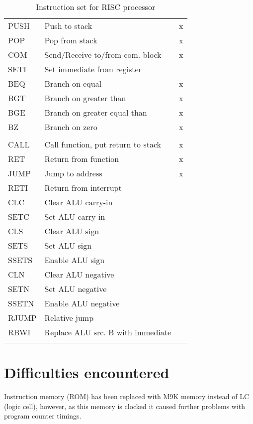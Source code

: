 \documentclass[a4paper,11pt]{article}
\begin{document}
\begin{table}[h!]
\begin{tabular}{| l | p{13cm} | c |}
		PUSH 
& Push to stack & x \\
		POP  
& Pop from stack & x \\
		COM  
& Send/Receive to/from com. block & x \\
		SETI 
& Set immediate from register & \\\hline
		
		BEQ  
& Branch on equal & x \\
		BGT  
& Branch on greater than & x \\
		BGE  
& Branch on greater equal than & x \\
		BZ   
& Branch on zero & x \\
		
		\rowcolor[rgb]{0.7,0.7,1}\arrayrulecolor{black}\hline
		\multicolumn{3}{|c|}{\textit{0 register instructions}} \\\hline
		\arrayrulecolor[rgb]{0.82,0.82,0.82} 
		
		CALL 
& Call function, put return to stack & x \\
		RET  
& Return from function & x \\
		JUMP 
& Jump to address & x \\
		RETI 
& Return from interrupt & \\
		CLC  
& Clear ALU carry-in & \\
		SETC 
& Set ALU carry-in & \\
		CLS  
& Clear ALU sign & \\
		SETS 
& Set ALU sign & \\
		SSETS
& Enable ALU sign & \\
		CLN  
& Clear ALU negative & \\
		SETN 
& Set ALU negative & \\
		SSETN
& Enable ALU negative & \\
		RJUMP
& Relative jump & \\
		RBWI 
& Replace ALU src. B with immediate & \\
		\arrayrulecolor{black}\hline
		
	\end{tabular}
	\caption{Instruction set for RISC processor}
	\label{table:risc_instr}
\end{table}

\section{Difficulties encountered}
Instruction memory (ROM) has been replaced with M9K memory instead of LC (logic cell), however, as this memory is clocked it caused further problems with program counter timings. 
\end{document}
